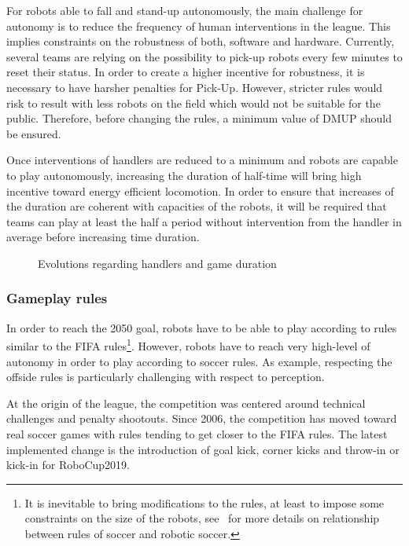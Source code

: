 \documentclass{article}
\begin{document}
For robots able to fall and stand-up autonomously,
the main challenge for autonomy is to reduce the frequency of human interventions in the league.
This implies constraints on the robustness of both, software and hardware.
Currently, several teams are relying on the possibility to pick-up robots every few minutes
to reset their status.
In order to create a higher incentive for robustness, it is necessary to have harsher penalties
for Pick-Up.
However, stricter rules would risk to result with less robots on the field which would not be
suitable for the public.
Therefore, before changing the rules, a minimum value of DMUP should be ensured.

Once interventions of handlers are reduced to a minimum and robots are capable to play autonomously,
increasing the duration of half-time will bring high incentive toward energy efficient locomotion.
In order to ensure that increases of the duration are coherent with capacities of the robots,
it will be required that teams can play at least the half a period without intervention
from the handler in average before increasing time duration.

\begin{figure}
  \centering
  
  \caption{\label{fig:handlers+game_duration}Evolutions regarding handlers and game duration}
\end{figure}

\subsubsection{Gameplay rules}
In order to reach the 2050 goal, robots have to be able to play according to
rules similar to the FIFA rules\footnote{It is inevitable to bring modifications
  to the rules, at least to impose some constraints on the size of the robots,
  see~\cite{Stone2010} for more details on relationship between rules of soccer
  and robotic soccer.}.
However, robots have to reach very high-level of autonomy in order to play according to soccer rules.
As example, respecting the offside rules is particularly challenging with respect to perception.

At the origin of the league,
the competition was centered around technical challenges and penalty shootouts.
Since 2006, the competition has moved toward real soccer games with rules tending
to get closer to the FIFA rules.
The latest implemented change is the introduction of goal kick, corner kicks and
throw-in or kick-in for RoboCup2019.
\end{document}
